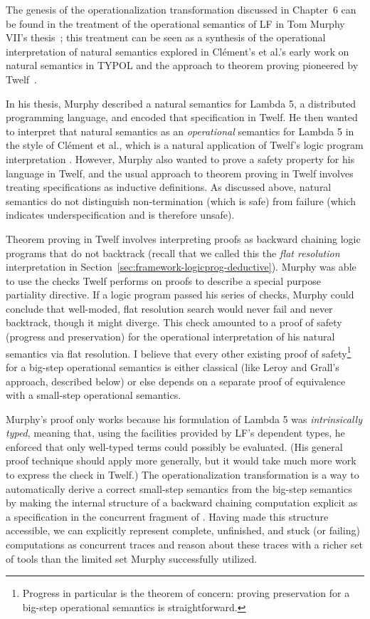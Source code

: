 The genesis of the operationalization transformation discussed in
Chapter~6 can be found in the treatment of the operational semantics
of LF in Tom Murphy VII's thesis~\cite{murphy08modal}; this treatment
can be seen as a synthesis of the operational interpretation of
natural semantics explored in Cl\'ement's et al.'s early work on
natural semantics in TYPOL and the approach to theorem proving
pioneered by Twelf~\cite{pfenning99system}.

In his thesis, Murphy described a natural semantics for Lambda 5, a
distributed programming language, and encoded that specification in
Twelf. He then wanted to interpret that natural semantics as an {\it
  operational} semantics for Lambda 5 in the style of Cl\'ement et
al., which is a natural application of Twelf's logic program
interpretation \cite{michaylov91natural}.  However, Murphy also wanted
to prove a safety property for his language in Twelf, and the usual
approach to theorem proving in Twelf involves treating specifications
as inductive definitions. As discussed above, natural semantics do not
distinguish non-termination (which is safe) from failure (which
indicates underspecification and is therefore unsafe).

Theorem proving in Twelf involves interpreting proofs as backward
chaining logic programs that do not backtrack (recall that we called
this the {\it flat resolution} interpretation in
Section~\ref{sec:framework-logicprog-deductive}).  Murphy was able to
use the checks Twelf performs on proofs to describe a special purpose
partiality directive. If a logic program passed his series of checks,
Murphy could conclude that well-moded, flat resolution search would
never fail and never backtrack, though it might diverge. This check
amounted to a proof of safety (progress and preservation) for the
operational interpretation of his natural semantics via flat
resolution. I believe that every other existing proof of
safety\footnote{Progress in particular is the theorem of concern:
  proving preservation for a big-step operational semantics is
  straightforward.} for a big-step operational semantics is either
classical (like Leroy and Grall's approach, described below) or else
depends on a separate proof of equivalence with a small-step
operational semantics.

Murphy's proof only works because his formulation of Lambda 5 was {\it
  intrinsically typed}, meaning that, using the facilities provided by
LF's dependent types, he enforced that only well-typed terms could
possibly be evaluated. (His general proof technique should apply more
generally, but it would take much more work to express the check in
Twelf.)  The operationalization transformation is a way to
automatically derive a correct small-step semantics from the big-step
semantics by making the internal structure of a backward chaining
computation explicit as a specification in the concurrent fragment of
\sls. Having made this structure accessible, we can explicitly
represent complete, unfinished, and stuck (or failing) computations as
concurrent traces and reason about these traces with a richer set of
tools than the limited set Murphy successfully utilized.

